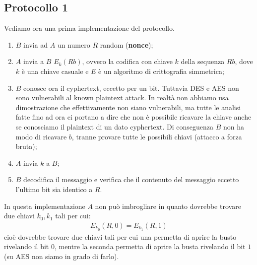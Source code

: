 \subsection{Protocollo 1}

Vediamo ora una prima implementazione del protocollo.

\begin{enumerate}
    \item $B$ invia ad $A$ un numero $R$ random (\textbf{nonce});
    \item $A$ invia a $B$ $E_k(Rb)$, ovvero la codifica con chiave $k$ della sequenza $Rb$, dove $k$ è una chiave casuale e $E$ è un algoritmo di crittografia simmetrica;
    \item $B$ conosce ora il cyphertext, eccetto per un bit. Tuttavia DES e AES non sono vulnerabili al known plaintext attack. In realtà non abbiamo usa dimostrazione che effettivamente non siano vulnerabili, ma tutte le analisi fatte fino ad ora ci portano a dire che non è possibile ricavare la chiave anche se conosciamo il plaintext di un dato cyphertext. Di conseguenza $B$ non ha modo di ricavare $b$, tranne provare tutte le possibili chiavi (attacco a forza bruta);
    \item $A$ invia $k$ a $B$;
    \item $B$ decodifica il messaggio e verifica che il contenuto del messaggio eccetto l'ultimo bit sia identico a $R$. 
\end{enumerate}

\noindent In questa implementazione $A$ non può imbrogliare in quanto dovrebbe trovare due chiavi $k_0, k_1$ tali per cui:
\begin{align*}
    E_k_0(R, 0) = E_k_1(R, 1)
\end{align*}
\noindent cioè dovrebbe trovare due chiavi tali per cui una permetta di aprire la busto rivelando il bit $0$, mentre la seconda permetta di aprire la busta rivelando il bit $1$ (su AES non siamo in grado di farlo).
\\

